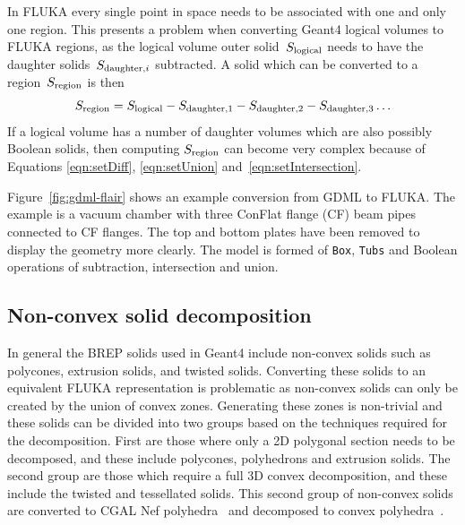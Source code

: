 \documentclass[final,5p,times,twocolumn]{elsarticle}
\begin{document}
In FLUKA every single point in space needs to be associated with one and only one region. This presents a problem
when converting Geant4 logical volumes to FLUKA regions, as the logical volume outer solid~$S_{\rm logical}$
needs to have the daughter  solids~$S_{{\rm daughter},i}$ subtracted. A solid which can be converted
to a region~$S_{\rm region}$ is then
\begin{equation}
S_{\rm region} =  S_{\rm logical} - S_{\rm daughter,1} - S_{\rm daughter,2} - S_{\rm daughter,3} \ldots
\label{eqn:logicalSubtraction}
\end{equation}
If a logical volume has a number of daughter volumes which are also possibly Boolean solids, then computing
$S_{\rm region}$ can become very complex because of Equations \ref{eqn:setDiff}, \ref{eqn:setUnion} and~\ref{eqn:setIntersection}.

Figure~\ref{fig:gdml-flair} shows an example conversion from GDML to FLUKA. The example is a
vacuum chamber with three ConFlat flange (CF) beam pipes connected to CF flanges. The top and bottom plates
have been removed to display the geometry more clearly. The model is formed of \verb|Box|,
\verb|Tubs| and Boolean operations of subtraction, intersection and union.

\subsection{Non-convex solid decomposition}
In general the BREP solids used in Geant4 include non-convex solids such
as polycones, extrusion solids, and twisted solids.  Converting these
solids to an equivalent FLUKA representation is problematic as non-convex
solids can only be created by the union of convex zones. Generating these
zones is non-trivial and these solids can be divided into two groups based
on the techniques required for the decomposition.  First are those where only a 2D polygonal
section needs to be decomposed, and these include polycones, polyhedrons
and extrusion solids.  The second group are those which require a full 3D
convex decomposition, and these include the twisted and tessellated solids.
This second group of non-convex solids are converted to CGAL Nef
polyhedra~\cite{cgal:hk-bonp3-20b} and decomposed to convex
polyhedra~\cite{cgal:h-emspe-20b}.
\end{document}
